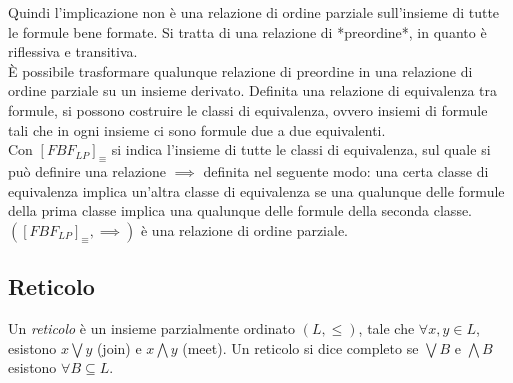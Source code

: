 Quindi l’implicazione non è una relazione di ordine parziale sull’insieme di tutte le formule bene formate. Si tratta di una relazione di *preordine*, in quanto è riflessiva e transitiva.\\

È possibile trasformare qualunque relazione di preordine in una relazione di ordine parziale su un insieme derivato.
Definita una relazione di equivalenza tra formule, si possono costruire le classi di equivalenza, ovvero insiemi di formule tali che in ogni insieme ci sono formule due a due equivalenti.\\

Con $[FBF_{LP}]_{\equiv}$ si indica l’insieme di tutte le classi di equivalenza, sul quale si può definire una relazione $\implies$ definita nel seguente modo: una certa classe di equivalenza implica un’altra classe di equivalenza se una qualunque delle formule della prima classe implica una qualunque delle formule della seconda classe.\\
$([FBF_{LP}]_{\equiv}, \implies)$ è una relazione di ordine parziale.

\subsection{Reticolo}
Un \textit{reticolo} è un insieme parzialmente ordinato $(L, \leq)$, tale che $\forall x, y \in L$, esistono $x \bigvee y$ (join) e $x \bigwedge y$ (meet).
Un reticolo si dice completo se $\bigvee B$ e $\bigwedge B$ esistono $\forall B \subseteq L$.